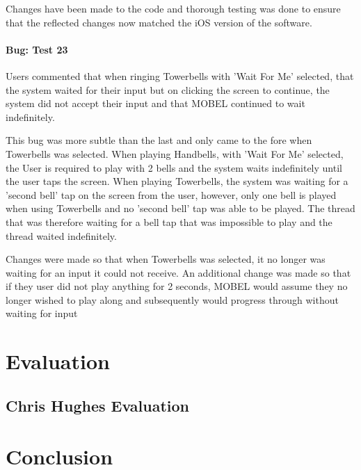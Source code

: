 \documentclass{l4proj}
\begin{document}
Changes have been made to the code and thorough testing was done to ensure that the reflected changes now matched the iOS version of the software.

\subsubsection{Bug: Test 23} 
Users commented that when ringing Towerbells with 'Wait For Me' selected, that the system waited for their input but on clicking the screen to continue, the system did not accept their input and that MOBEL continued to wait indefinitely. 

This bug was more subtle than the last and only came to the fore when Towerbells was selected.  When playing Handbells, with 'Wait For Me' selected, the User is required to play with 2 bells and the system waits indefinitely until the user taps the screen.  When playing Towerbells, the system was waiting for a 'second bell' tap on the screen from the user, however, only one bell is played when using Towerbells and no 'second bell' tap was able to be played.  The thread that was therefore waiting for a bell tap that was impossible to play and the thread waited indefinitely. 

Changes were made so that when Towerbells was selected, it no longer was waiting for an input it could not receive.  An additional change was made so that if they user did not play anything for 2 seconds, MOBEL would assume they no longer wished to play along and subsequently would progress through without waiting for input 

\chapter{Evaluation}

\section{Chris Hughes Evaluation}

\chapter{Conclusion}
\end{document}
